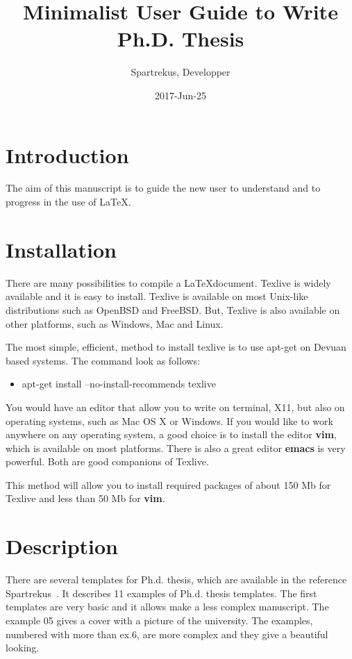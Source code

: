 \documentclass[11pt]{article}
\newcommand{\mbf}[1]{{\bfseries #1}}
\begin{document}
\title{{\bfseries  Minimalist User Guide to Write Ph.D. Thesis}}
\author{Spartrekus, Developper}
\date{2017-Jun-25}
\maketitle


\section{Introduction}
The aim of this manuscript is to guide 
the new user to understand and to progress in the use
of \LaTeX.

\section{Installation}
There are many possibilities to compile a \LaTeX document.
Texlive is widely available and it is easy to install.
Texlive is available on most Unix-like distributions such as OpenBSD and FreeBSD.
But, Texlive is also available on other platforms, such as Windows, Mac and Linux.

The most simple, efficient, method to install texlive is to use 
apt-get on Devuan based systems. 
The command look as follows: 
\begin{itemize}
\item apt-get install --no-install-recommends texlive
\end{itemize}

You would have an editor that allow you to write on terminal, X11, but also
on operating systems, such as Mac OS X or Windows.
If you would like to work anywhere on any operating system, a good choice is 
to install the editor \mbf{vim}, which is available on most platforms. 
There is also a great editor \mbf{emacs} is very powerful. Both are good companions 
of Texlive.

This method will allow you 
to install required packages of about 150 Mb for Texlive and
less than 50 Mb for \mbf{vim}. 

\section{Description}
There are several templates for Ph.d. thesis, which are available in the 
reference Spartrekus~\cite{spartrekus2324898}.
It describes 11 examples of Ph.d. thesis templates. The first templates 
are very basic and it allows make a less complex manuscript.
The example 05 gives a cover with a picture of the university.
The examples, numbered with more than ex.6, are more complex and 
they give a beautiful looking.
\end{document}
